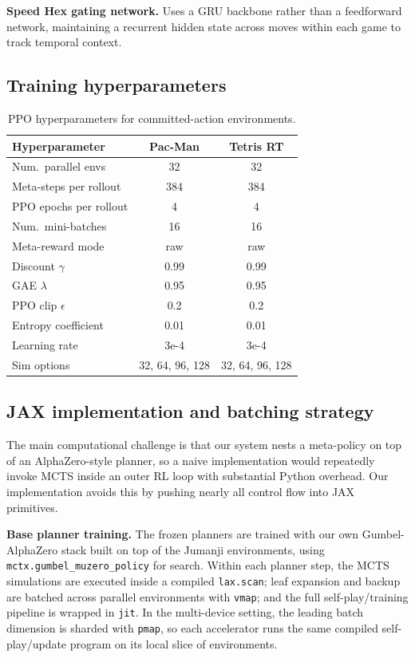 \textbf{Speed Hex gating network.}
Uses a GRU backbone rather than a feedforward network, maintaining a recurrent hidden
state across moves within each game to track temporal context.

\subsection{Training hyperparameters}

\begin{table}[h]
  \centering
  \caption{PPO hyperparameters for committed-action environments.}
  \label{tab:hparams}
  \begin{tabular}{lcc}
    \toprule
    Hyperparameter & Pac-Man & Tetris RT \\
    \midrule
    Num.\ parallel envs     & 32   & 32   \\
    Meta-steps per rollout  & 384  & 384  \\
    PPO epochs per rollout  & 4    & 4    \\
    Num.\ mini-batches      & 16   & 16   \\
    Meta-reward mode        & raw  & raw  \\
    Discount $\gamma$       & 0.99 & 0.99 \\
    GAE $\lambda$           & 0.95 & 0.95 \\
    PPO clip $\epsilon$     & 0.2  & 0.2  \\
    Entropy coefficient     & 0.01 & 0.01 \\
    Learning rate           & 3e-4 & 3e-4 \\
    Sim options             & 32, 64, 96, 128 & 32, 64, 96, 128 \\
    \bottomrule
  \end{tabular}
\end{table}

\subsection{JAX implementation and batching strategy}

The main computational challenge is that our system nests a meta-policy on top of
an AlphaZero-style planner, so a naive implementation would repeatedly invoke MCTS
inside an outer RL loop with substantial Python overhead. Our implementation avoids
this by pushing nearly all control flow into JAX primitives.

\textbf{Base planner training.}
The frozen planners are trained with our own Gumbel-AlphaZero stack built on top of
the Jumanji environments, using
\texttt{mctx.gumbel\_muzero\_policy} for search. Within each planner step, the MCTS
simulations are executed inside a compiled \texttt{lax.scan}; leaf expansion and
backup are batched across parallel environments with \texttt{vmap}; and the full
self-play/training pipeline is wrapped in \texttt{jit}. In the multi-device setting,
the leading batch dimension is sharded with \texttt{pmap}, so each accelerator runs
the same compiled self-play/update program on its local slice of environments.

